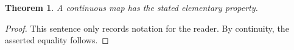 \documentclass{article}
\newtheorem{theorem}{Theorem}
\begin{document}
\begin{theorem}\label{thm:expository}
A continuous map has the stated elementary property.
\end{theorem}
\begin{proof}
This sentence only records notation for the reader.
By continuity, the asserted equality follows.
\end{proof}
\end{document}

